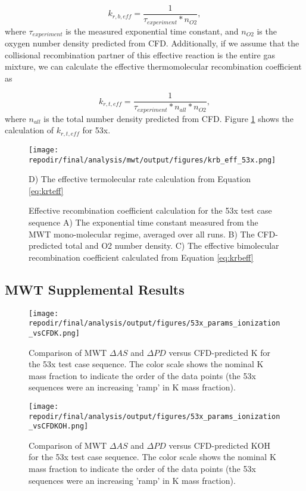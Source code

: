 \begin{equation}
    \label{eq:krbeff}
    k_{r,b,eff} = \frac{1}{\tau_{experiment} *  n_{O2}},
\end{equation}
where $\tau_{experiment}$ is the measured exponential time constant,  and $n_{O2}$ is the oxygen number density predicted from CFD. Additionally, if we assume that the collisional recombination partner of this effective reaction is the entire gas mixture, we can calculate the effective thermomolecular recombination coefficient as


\begin{equation}
    \label{eq:krteff}
    k_{r,t,eff} = \frac{1}{\tau_{experiment} * n_{all} *  n_{O2}},
\end{equation}
where $n_{all}$ is the total number density predicted from CFD. Figure \ref{fig:SI_krb_eff_53x} shows the calculation of $k_{r,t,eff}$ for 53x.

\begin{figure}[]
\centering
\texttt{[image: \\repodir/final/analysis/mwt/output/figures/krb\_eff\_53x.png]}
\caption{Effective recombination coefficient calculation for the 53x test case sequence A) The exponential time constant measured from the MWT mono-molecular regime, averaged over all runs. B) The CFD-predicted total and O2 number density. C) The effective bimolecular recombination coefficient calculated from Equation \ref{eq:krbeff}} D) The effective termolecular rate calculation from Equation \ref{eq:krteff}
\label{fig:SI_krb_eff_53x}
\end{figure}

\subsection{MWT Supplemental Results}

\begin{figure}[h]
    \centering
    \texttt{[image: \\repodir/final/analysis/output/figures/53x\_params\_ionization\_vsCFDK.png]} 
    \caption{Comparison of MWT $\Delta AS$ and $\Delta PD$ versus CFD-predicted K for the 53x test case sequence. The color scale shows the nominal K mass fraction to indicate the order of the data points (the 53x sequences were an increasing 'ramp' in K mass fraction).}
    \label{fig:SI_53x_params_ionization_vsCFDK}
\end{figure}

\begin{figure}[h]
    \centering
    \texttt{[image: \\repodir/final/analysis/output/figures/53x\_params\_ionization\_vsCFDKOH.png]} 
    \caption{Comparison of MWT $\Delta AS$ and $\Delta PD$ versus CFD-predicted KOH for the 53x test case sequence. The color scale shows the nominal K mass fraction to indicate the order of the data points (the 53x sequences were an increasing 'ramp' in K mass fraction).}
    \label{fig:SI_53x_params_ionization_vsCFDKOH}
\end{figure}



